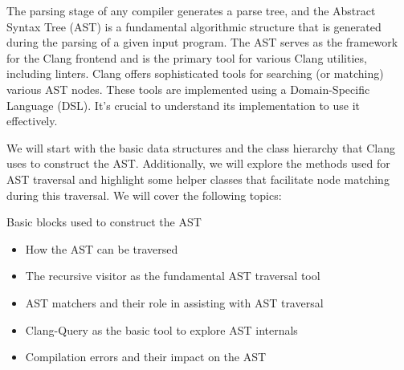 The parsing stage of any compiler generates a parse tree, and the Abstract Syntax Tree (AST) is a fundamental algorithmic structure that is generated during the parsing of a given input program. The AST serves as the framework for the Clang frontend and is the primary tool for various Clang utilities, including linters. Clang offers sophisticated tools for searching (or matching) various AST nodes. These tools are implemented using a Domain-Specific Language (DSL). It's crucial to understand its implementation to use it effectively.

We will start with the basic data structures and the class hierarchy that Clang uses to construct the AST. Additionally, we will explore the methods used for AST traversal and highlight some helper classes that facilitate node matching during this traversal. We will cover the following topics:

Basic blocks used to construct the AST

\begin{itemize}
\item
How the AST can be traversed

\item
The recursive visitor as the fundamental AST traversal tool

\item
AST matchers and their role in assisting with AST traversal

\item
Clang-Query as the basic tool to explore AST internals

\item
Compilation errors and their impact on the AST
\end{itemize}